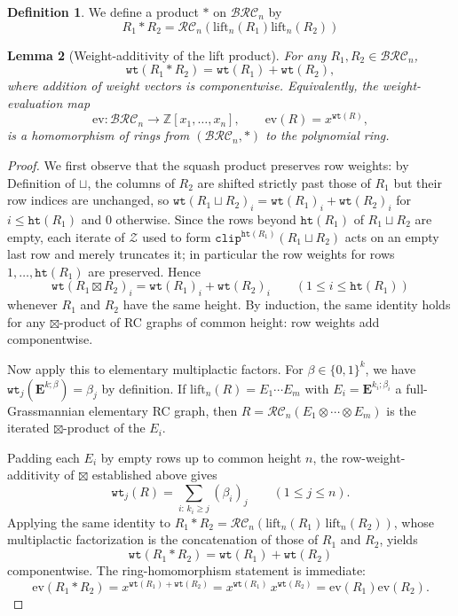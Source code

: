 \documentclass[a4paper,fleqn]{cas-sc}
\newtheorem{lemma}{Lemma}[subsection]
\theoremstyle{definition}
\newtheorem{definition}[lemma]{Definition}
\theoremstyle{remark}
\numberwithin{equation}{subsection}
\newcommand{\wtt}{\mathtt{wt}}
\newcommand{\zeromap}{\mathcal{Z}}
\newcommand{\hr}{\mathtt{ht}}
\newcommand{\clp}{\mathtt{clip}}
\newcommand{\BRC}{\mathcal{BRC}}
\newcommand{\RC}{\mathcal{RC}}
\begin{document}
\begin{definition}
We define a product $*$ on $\BRC_n$ by
$$R_1*R_2 = \RC_n(\mathrm{lift}_n(R_1)\mathrm{lift}_n(R_2))$$
\end{definition}

\begin{lemma}[Weight-additivity of the lift product]\label{lemma:liftweight}
For any $R_1, R_2\in\BRC_n$,
$$\wtt(R_1 * R_2) = \wtt(R_1) + \wtt(R_2),$$
where addition of weight vectors is componentwise. Equivalently, the weight-evaluation map
$$\mathrm{ev}:\BRC_n\to\mathbb{Z}[x_1,\ldots,x_n],\qquad \mathrm{ev}(R) = x^{\wtt(R)},$$
is a homomorphism of rings from $(\BRC_n,*)$ to the polynomial ring.
\end{lemma}
\begin{proof}
We first observe that the squash product preserves row weights: by Definition of $\sqcup$, the columns of $R_2$ are shifted strictly past those of $R_1$ but their row indices are unchanged, so $\wtt(R_1\sqcup R_2)_i = \wtt(R_1)_i + \wtt(R_2)_i$ for $i\leq \hr(R_1)$ and $0$ otherwise. Since the rows beyond $\hr(R_1)$ of $R_1\sqcup R_2$ are empty, each iterate of $\zeromap$ used to form $\clp^{\hr(R_1)}(R_1\sqcup R_2)$ acts on an empty last row and merely truncates it; in particular the row weights for rows $1,\ldots,\hr(R_1)$ are preserved. Hence
$$\wtt(R_1\boxtimes R_2)_i = \wtt(R_1)_i + \wtt(R_2)_i\qquad (1\leq i\leq \hr(R_1))$$
whenever $R_1$ and $R_2$ have the same height. By induction, the same identity holds for any $\boxtimes$-product of RC graphs of common height: row weights add componentwise.

Now apply this to elementary multiplactic factors. For $\beta\in\{0,1\}^k$, we have $\wtt_j(\mathbf{E}^{k;\beta}) = \beta_j$ by definition. If $\mathrm{lift}_n(R) = E_1\cdots E_m$ with $E_i = \mathbf{E}^{k_i;\beta_i}$ a full-Grassmannian elementary RC graph, then $R = \RC_n(E_1\otimes\cdots\otimes E_m)$ is the iterated $\boxtimes$-product of the $E_i$.

Padding each $E_i$ by empty rows up to common height $n$, the row-weight-additivity of $\boxtimes$ established above gives
$$\wtt_j(R) = \sum_{i:\,k_i\geq j} (\beta_i)_j\qquad (1\leq j\leq n).$$
Applying the same identity to $R_1*R_2 = \RC_n(\mathrm{lift}_n(R_1)\,\mathrm{lift}_n(R_2))$, whose multiplactic factorization is the concatenation of those of $R_1$ and $R_2$, yields
$$\wtt(R_1*R_2) = \wtt(R_1) + \wtt(R_2)$$
componentwise. The ring-homomorphism statement is immediate:
$$\mathrm{ev}(R_1*R_2) = x^{\wtt(R_1)+\wtt(R_2)} = x^{\wtt(R_1)}\,x^{\wtt(R_2)} = \mathrm{ev}(R_1)\mathrm{ev}(R_2).$$
\end{proof}
\end{document}
